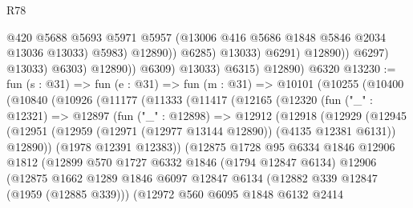 \begin{lexlean}{R78}
\begin{coremodule}
                                      @420
                                      @5688
                                      @5693
                                      @5971
                                      @5957
                                      (@13006 @416 @5686 @1848 @5846 @2034 @13036 @13033)
                                      @5983)
                                    @12890))
                                @6285)
                              @13033)
                            @6291)
                          @12890))
                      @6297)
                    @13033)
                  @6303)
                @12890))
            @6309)
          @13033)
        @6315)
      @12890)
    @6320
@13230 := fun (s : @31) =>
  fun (e : @31) =>
  fun (m : @31) =>
  @10101
    (@10255
      (@10400
        (@10840
          (@10926
            (@11177
              (@11333
                (@11417
                  (@12165
                    (@12320
                      (fun ("_" : @12321) =>
                      @12897
                        (fun ("_" : @12898) =>
                        @12912
                          (@12918
                            (@12929
                              (@12945
                                (@12951
                                  (@12959 (@12971 (@12977 @13144 @12890)) (@4135 @12381 @6131))
                                  @12890))
                              (@1978 @12391 @12383))
                            (@12875
                              @1728
                              @95
                              @6334
                              @1846
                              @12906
                              @1812
                              (@12899
                                @570
                                @1727
                                @6332
                                @1846
                                (@1794 @12847 @6134)
                                @12906
                                (@12875
                                  @1662
                                  @1289
                                  @1846
                                  @6097
                                  @12847
                                  @6134
                                  (@12882 @339 @12847 (@1959 (@12885 @339)))
                                  (@12972
                                    @560
                                    @6095
                                    @1848
                                    @6132
                                    @2414

\end{coremodule}
\end{lexlean}
